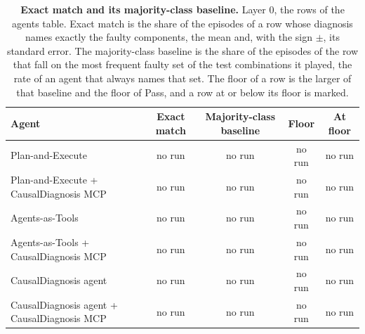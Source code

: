 \documentclass[10pt]{article}
\begin{document}
\vspace{-8pt}
\begin{table}[H]\centering\footnotesize
\caption{\textbf{Exact match and its majority-class baseline.} Layer 0, the rows of the agents table. Exact match is the share of the episodes of a row whose diagnosis names exactly the faulty components, the mean and, with the sign $\pm$, its standard error. The majority-class baseline is the share of the episodes of the row that fall on the most frequent faulty set of the test combinations it played, the rate of an agent that always names that set. The floor of a row is the larger of that baseline and the floor of Pass, and a row at or below its floor is marked.}
\label{tab:exactmatch}
\setlength{\tabcolsep}{3pt}
\begin{tabular}{lcccc}
\toprule
Agent & Exact match & Majority-class baseline & Floor & At floor \\
\midrule
Plan-and-Execute & no run & no run & no run & no run \\
Plan-and-Execute + CausalDiagnosis MCP & no run & no run & no run & no run \\
Agents-as-Tools & no run & no run & no run & no run \\
Agents-as-Tools + CausalDiagnosis MCP & no run & no run & no run & no run \\
CausalDiagnosis agent & no run & no run & no run & no run \\
CausalDiagnosis agent + CausalDiagnosis MCP & no run & no run & no run & no run \\
\bottomrule
\end{tabular}
\end{table}
\vspace{-8pt}
\end{document}

